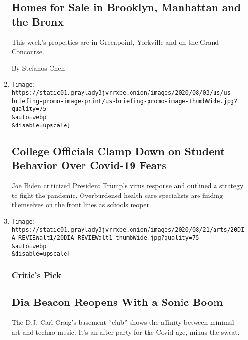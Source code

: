 \begin{enumerate}
{  \subsection{Homes for Sale in Brooklyn, Manhattan and the
  Bronx}\label{homes-for-sale-in-brooklyn-manhattan-and-the-bronx}}

  This week's properties are in Greenpoint, Yorkville and on the Grand
  Concourse.

  By Stefanos Chen
\item
  \href{/2020/08/20/world/coronavirus-covid.html}{}

  \texttt{[image: https://static01.graylady3jvrrxbe.onion/images/2020/08/03/us/us-briefing-promo-image-print/us-briefing-promo-image-thumbWide.jpg?quality=75\\\&auto=webp\\\&disable=upscale]}

  \hypertarget{college-officials-clamp-down-on-student-behavior-over-covid-19-fears}{%
  \subsection{College Officials Clamp Down on Student Behavior Over
  Covid-19
  Fears}\label{college-officials-clamp-down-on-student-behavior-over-covid-19-fears}}

  Joe Biden criticized President Trump's virus response and outlined a
  strategy to fight the pandemic. Overburdened health care specialists
  are finding themselves on the front lines as schools reopen.
\item
  \href{/2020/08/20/arts/design/dia-beacon-reopen-coronavirus.html}{}

  \texttt{[image: https://static01.graylady3jvrrxbe.onion/images/2020/08/21/arts/20DIA-REVIEWalt1/20DIA-REVIEWalt1-thumbWide.jpg?quality=75\\\&auto=webp\\\&disable=upscale]}

  \hypertarget{critics-pick}{%
  \subsubsection{Critic's Pick}\label{critics-pick}}

  \hypertarget{dia-beacon-reopens-with-a-sonic-boom}{%
  \subsection{Dia Beacon Reopens With a Sonic
  Boom}\label{dia-beacon-reopens-with-a-sonic-boom}}

  The D.J. Carl Craig's basement ``club'' shows the affinity between
  minimal art and techno music. It's an after-party for the Covid age,
  minus the sweat.


\end{enumerate}
